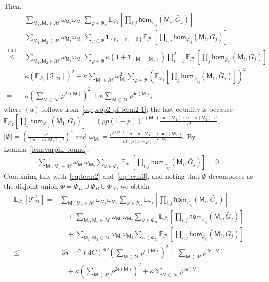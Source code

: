 \documentclass[letterpaper,11pt]{article}
\theoremstyle{definition}
\newcommand{\maM}{\mathcal{M}}
\newcommand{\maP}{\mathcal{P}}
\newcommand{\maT}{\mathcal{T}}
\newcommand{\en}{\mathsf{{e}}}
\newcommand{\vn}{\mathsf{{v}}}
\newcommand{\pth}[1]{\left( #1 \right)}
\newcommand{\qth}[1]{\left[ #1 \right]}
\newcommand{\sfM}{{\mathsf{M}}}
\newcommand{\sfn}{{\mathsf{n}}}
\newcommand{\indc}[1]{{\mathbf{1}_{\left\{{#1}\right\}}}}
\newcommand{\aut}{\mathsf{aut}}
\renewcommand{\hom}{\mathsf{hom}}
\newcommand{\vp}{\varphi}
\def\E{\mathbb{E}}
\begin{document}
Then, \begin{align}
    \nonumber &~\sum_{\sfM_1,\sfM_2\in \maM}\omega_{\sfM_1}\omega_{\sfM_2}\sum_{\vp\in \Phi_N} \E_{\maP_1}\qth{\prod_{i,j}\hom_{\vp_{ij}}(\sfM_i,\bar{G}_j)} \\\nonumber =&~\sum_{\sfM_1,\sfM_2\in \maM}\omega_{\sfM_1}\omega_{\sfM_2}\sum_{\vp\in \Phi} \indc{\sfn_1 = \sfn_2 = 0} \E_{\maP_1}\qth{\prod_{i,j}\hom_{\vp_{ij}}(\sfM_i,\bar{G}_j)} \\\nonumber\overset{\mathrm{(a)}}{\le}&~\sum_{\sfM_1,\sfM_2\in \maM}\omega_{\sfM_1}\omega_{\sfM_2}\sum_{\vp\in \Phi} \kappa (1+\indc{\sfM_1 = \sfM_2})  \prod_{i=1}^2\E_{\maP_1}\qth{\prod_{j}\hom_{\vp_{ij}}(\sfM_i,\bar{G}_j)}\\\nonumber=&~\kappa \pth{\E_{\maP_1}\qth{\maT_{\maM}}}^2+\kappa \sum_{\sfM_1\in \maM} \omega_{\sfM_1}^2 \sum_{\vp\in \Phi} \pth{\E_{\maP_1}\qth{\prod_{j}\hom_{\vp_{1j}}(\sfM_1,\bar{G}_j)}}^2\\\label{eq:term3}=&~\kappa \pth{\sum_{\sfM\in \maM} \rho^{2\en(\sfM)}}^2+\kappa \sum_{\sfM\in \maM} \rho^{4\en(\sfM)},
\end{align}
where $\mathrm{(a)}$ follows from~\eqref{eq:prop2-pf-term2-1}; the last equality is because  $\E_{\maP_1}\qth{\prod_{j}\hom_{\vp_{1j}}(\sfM_1,\bar{G}_j)} = (\rho p (1-p))^{\en(\sfM_1)} \frac{\aut(\sfM_1) (n-\vn(\sfM_1))!}{n!}$, $|\Phi|=\pth{\frac{n!}{(n-\vn(\sfM_1))!}}^4$ and $\omega_{\sfM_1} = \frac{\rho^{\en(\sfM_1)}(n-\vn(\sfM_1))!\aut(\sfM_1)}{n!(p(1-p))^{\en(\sfM_1)}}$.
By Lemma~\ref{lem:varphi-bound}, \begin{align*}
    \sum_{\sfM_1,\sfM_2\in \maM}\omega_{\sfM_1}\omega_{\sfM_2}\sum_{\vp\in \Phi_D}  \E_{\maP_1}\qth{\prod_{i,j}\hom_{\vp_{ij}}(\sfM_i,\bar{G}_j)}=0.
\end{align*}
Combining this with~\eqref{eq:term2} and~\eqref{eq:term3}, and noting that $\Phi$ decomposes as the disjoint union
 $\Phi = \Phi_D\cup \Phi_B\cup \Phi_N$,
we obtain  \begin{align*}
    \E_{\maP_1}\qth{\maT_{\maM}^2} =&  \sum_{\sfM_1,\sfM_2\in \maM}\omega_{\sfM_1}\omega_{\sfM_2}\sum_{\vp\in \Phi_D} \E_{\maP_1}\qth{\prod_{i,j}\hom_{\vp_{ij}}(\sfM_i,\bar{G}_j)}\\&\quad+\sum_{\sfM_1,\sfM_2\in \maM}\omega_{\sfM_1}\omega_{\sfM_2}\sum_{\vp\in \Phi_B}  \E_{\maP_1}\qth{\prod_{i,j}\hom_{\vp_{ij}}(\sfM_i,\bar{G}_j)}\\&\quad+\sum_{\sfM_1,\sfM_2\in \maM}\omega_{\sfM_1}\omega_{\sfM_2}\sum_{\vp\in \Phi_N} \E_{\maP_1}\qth{\prod_{i,j}\hom_{\vp_{ij}}(\sfM_i,\bar{G}_j)}\\
    \le&~  3n^{-\epsilon_0/2} (4C)^{8C} \pth{\sum_{\sfM\in \maM} \rho^{\en(\sfM)}}^2+\sum_{\sfM\in\maM} \rho^{2\en(\sfM)}\\&\quad+\kappa \pth{\sum_{\sfM\in \maM} \rho^{2\en(\sfM)}}^2+\kappa \sum_{\sfM\in \maM} \rho^{4\en(\sfM)}.
\end{align*}
\end{document}
